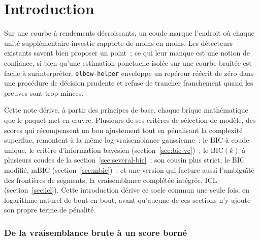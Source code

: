 \documentclass[11pt]{article}
\newcommand{\code}[1]{\texttt{#1}}
\begin{document}
\part{Introduction}
\label{sec:intro}

Sur une courbe à rendements décroissants, un coude marque l'endroit où
chaque unité supplémentaire investie rapporte de moins en moins. Les
détecteurs existants savent bien proposer un point~; ce qui leur manque
est une notion de confiance, si bien qu'une estimation ponctuelle isolée
sur une courbe bruitée est facile à surinterpréter. \code{elbow-helper}
enveloppe un repéreur réécrit de zéro dans une procédure de décision
prudente et refuse de trancher franchement quand les preuves sont trop
minces.

Cette note dérive, à partir des principes de base, chaque brique
mathématique que le paquet met en œuvre. Plusieurs de ses critères de
sélection de modèle, des scores qui récompensent un bon ajustement tout en
pénalisant la complexité superflue, remontent à la même log-vraisemblance
gaussienne~: le $\mathrm{BIC}$ à coude unique, le critère d'information
bayésien (section~\ref{sec:bic-vc})~; le $\mathrm{BIC}(k)$ à plusieurs
coudes de la section~\ref{sec:several-bic}~; son cousin plus strict, le
BIC modifié, $\mathrm{mBIC}$ (section~\ref{sec:mbic})~; et une version qui
facture aussi l'ambiguïté des frontières de segments, la vraisemblance
complétée intégrée, $\mathrm{ICL}$ (section~\ref{sec:icl}). Cette
introduction dérive ce socle commun une seule fois, en logarithme naturel
de bout en bout, avant qu'aucune de
ces sections n'y ajoute son propre terme de pénalité.

\section{De la vraisemblance brute à un score borné}
\label{sec:likelihood-intro}
\end{document}
